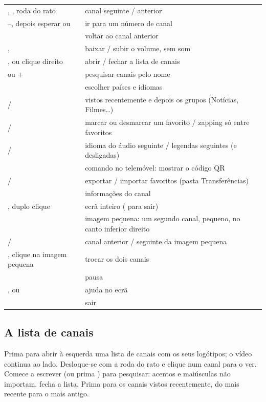 \begin{xltabular}{\linewidth}{@{}KX@{}}
\key{$\uparrow$} \key{$\downarrow$},  , roda do rato & canal seguinte / anterior \\
--, depois esperar ou  & ir para um número de canal \\
 & voltar ao canal anterior \\
\key{$\leftarrow$} \key{$\rightarrow$},  & baixar / subir o volume, sem som \\
,  ou clique direito & abrir / fechar a lista de canais \\
\key{/} ou + & pesquisar canais pelo nome \\
 & escolher países e idiomas \\
 /  & vistos recentemente e depois os grupos (Notícias, Filmes\ldots) \\
 /  & marcar ou desmarcar um favorito / zapping só entre favoritos \\
 /  & idioma do áudio seguinte / legendas seguintes (e desligadas) \\
 & comando no telemóvel: mostrar o código QR \\
 /  & exportar / importar favoritos (pasta Transferências) \\
 & informações do canal \\
, duplo clique & ecrã inteiro ( para sair) \\
 & imagem pequena: um segundo canal, pequeno, no canto inferior direito \\
\key{[} / \key{]} & canal anterior / seguinte da imagem pequena \\
, clique na imagem pequena & trocar os dois canais \\
 & pausa \\
,  ou  & ajuda no ecrã \\
 & sair \\
\bottomrule
\end{xltabular}

\subsection{A lista de canais}
Prima  para abrir à esquerda uma lista de canais com os seus
logótipos; o vídeo continua ao lado. Desloque-se com a roda do rato e clique
num canal para o ver. Comece a escrever (ou prima \key{/}) para pesquisar:
acentos e maiúsculas não importam.  fecha a lista. Prima 
para os canais vistos recentemente, do mais recente para o mais antigo.

